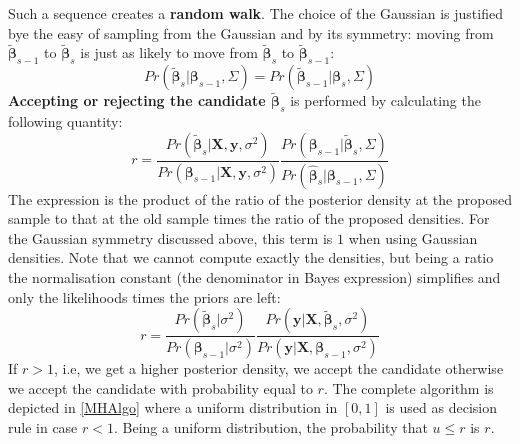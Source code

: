 \documentclass[12pt, letterpaper]{article}
\theoremstyle{definition}
\newcommand{\X}{\mathrm{\mathbf{X}}}
\newcommand{\y}{\mathbf{y}}
\newcommand{\be}{\mathbf{\beta}}
\newcommand{\ssq}{\sigma^2}
\begin{document}
Such a sequence creates a \textbf{random walk}. The choice of the Gaussian is justified bye the easy of sampling from the Gaussian and by its symmetry: moving from $\tilde{\be}_{s-1}$ to $\tilde{\be}_s$ is just as likely to move from $\tilde{\be}_s$ to $\tilde{\be}_{s-1}$:
\begin{equation}
Pr(\tilde{\be}_s|\be_{s-1}, \Sigma)  = Pr(\tilde{\be}_{s-1}|\be_{s}, \Sigma) 
\end{equation}
\textbf{Accepting or rejecting the candidate $\tilde{\be}_s$} is performed by calculating the following quantity:
\begin{equation}
r = \frac{Pr(\tilde{\be}_s|\X, \y, \ssq)}{Pr(\be_{s-1}|\X, \y, \ssq)}\frac{Pr(\be_{s-1}|\tilde{\be}_s, \Sigma)}{Pr(\hat{\be}_{s}|\be_{s-1}, \Sigma)}
\end{equation}
The expression is the product of the ratio of the posterior density at the proposed sample to that at the old sample times the ratio of the proposed densities. For the Gaussian symmetry discussed above, this term is $1$ when using Gaussian densities. Note that we cannot compute exactly the densities, but being a ratio the normalisation constant (the denominator in Bayes expression) simplifies and only the likelihoods times the priors are left:
\begin{equation}
r = \frac{Pr(\tilde{\be}_s|\ssq)}{Pr(\be_{s-1}| \ssq)} \frac{Pr(\y|\X, \tilde{\be}_s, \ssq)}{Pr(\y|\X, \be_{s-1}, \ssq)}
\end{equation}
If $r>1$, i.e, we get a higher posterior density, we accept the candidate otherwise we accept the candidate with probability equal to $r$. The complete algorithm is depicted in \ref{MHAlgo} where a uniform distribution in $[0,1]$ is used as decision rule in case $r<1$. Being a uniform distribution, the probability that $u \le r$ is $r$.
\end{document}
